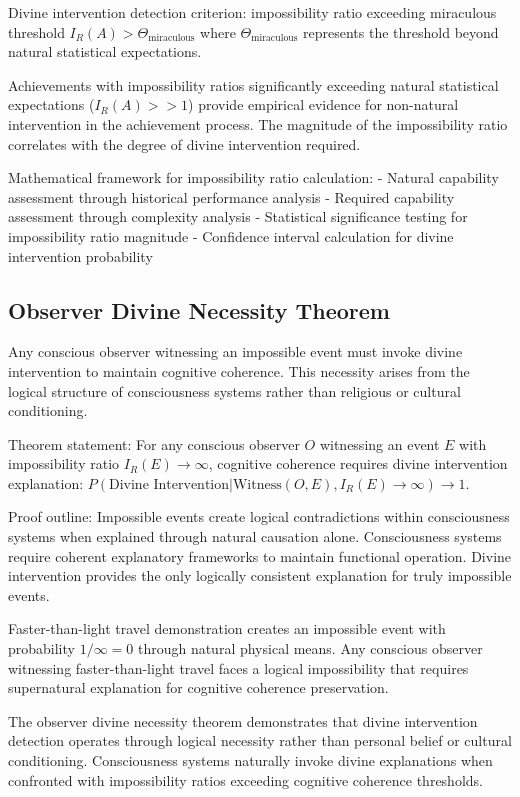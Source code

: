 \documentclass[12pt,a4paper]{article}
\begin{document}
Divine intervention detection criterion: impossibility ratio exceeding miraculous threshold $I_R(A) > \Theta_{\text{miraculous}}$ where $\Theta_{\text{miraculous}}$ represents the threshold beyond natural statistical expectations.

Achievements with impossibility ratios significantly exceeding natural statistical expectations ($I_R(A) >> 1$) provide empirical evidence for non-natural intervention in the achievement process. The magnitude of the impossibility ratio correlates with the degree of divine intervention required.

Mathematical framework for impossibility ratio calculation:
- Natural capability assessment through historical performance analysis
- Required capability assessment through complexity analysis
- Statistical significance testing for impossibility ratio magnitude
- Confidence interval calculation for divine intervention probability

\subsection{Observer Divine Necessity Theorem}

Any conscious observer witnessing an impossible event must invoke divine intervention to maintain cognitive coherence. This necessity arises from the logical structure of consciousness systems rather than religious or cultural conditioning.

Theorem statement: For any conscious observer $O$ witnessing an event $E$ with impossibility ratio $I_R(E) \to \infty$, cognitive coherence requires divine intervention explanation: $P(\text{Divine Intervention} | \text{Witness}(O, E), I_R(E) \to \infty) \to 1$.

Proof outline: Impossible events create logical contradictions within consciousness systems when explained through natural causation alone. Consciousness systems require coherent explanatory frameworks to maintain functional operation. Divine intervention provides the only logically consistent explanation for truly impossible events.

Faster-than-light travel demonstration creates an impossible event with probability $1/\infty = 0$ through natural physical means. Any conscious observer witnessing faster-than-light travel faces a logical impossibility that requires supernatural explanation for cognitive coherence preservation.

The observer divine necessity theorem demonstrates that divine intervention detection operates through logical necessity rather than personal belief or cultural conditioning. Consciousness systems naturally invoke divine explanations when confronted with impossibility ratios exceeding cognitive coherence thresholds.
\end{document}
